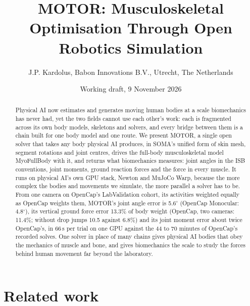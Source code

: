 \documentclass[11pt]{article}
\title{MOTOR: Musculoskeletal Optimisation Through Open Robotics Simulation}
\author{J.P. Kardolus, Babon Innovations B.V., Utrecht, The Netherlands}
\date{Working draft, 9 November 2026}
\newcommand{\dg}{\ensuremath{^\circ}}
\begin{document}
\maketitle

\begin{abstract}
\noindent Physical AI now estimates and generates moving human bodies at a scale biomechanics has never had, yet
the two fields cannot use each other's work: each is fragmented across its own body models, skeletons and solvers,
and every bridge between them is a chain built for one body model and one route. We present MOTOR, a single open
solver that takes any body physical AI produces, in SOMA's unified form of skin mesh, segment rotations and joint
centres, drives the full-body musculoskeletal model MyoFullBody with it, and returns what biomechanics measures: joint
angles in the ISB conventions, joint moments, ground reaction forces and the force in every muscle. It runs on
physical AI's own GPU stack, Newton and MuJoCo Warp, because the more complex the bodies and movements we simulate,
the more parallel a solver has to be. From one camera on OpenCap's LabValidation cohort, its activities weighted
equally as OpenCap weights them, MOTOR's joint angle error is 5.6\dg{} (OpenCap Monocular: 4.8\dg), its vertical
ground force error 13.3\% of body weight (OpenCap, two cameras: 11.4\%; without drop jumps 10.5 against 6.8\%) and
its joint moment error about twice OpenCap's, in 66\,s per trial on one GPU against the 44 to 70 minutes of
OpenCap's recorded solves. One solver in place of many chains gives physical AI bodies
that obey the mechanics of muscle and bone, and gives biomechanics the scale to study the forces behind human
movement far beyond the laboratory.
\end{abstract}

\section{Related work}
\end{document}

